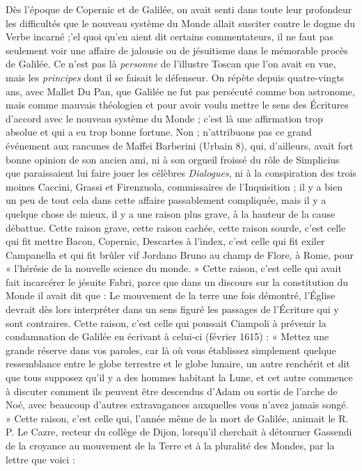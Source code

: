 \documentclass[a4paper, 11pt, oneside]{article}
\begin{document}
Dès l'époque de Copernic et de Galilée, on avait senti dans toute leur profondeur les difficultés que le nouveau système du Monde allait susciter contre le dogme du Verbe incarné ;'el quoi qu'en aient dit certains commentateurs, il ne faut pas seulement voir une affaire de jalousie ou de jésuitisme dans le mémorable procès de Galilée. Ce n'est pas là \emph{personne} de l'illustre Toscan que l'on avait en vue, mais les \emph{principes} dont il se faisait le défenseur. On répète depuis quatre-vingts ans, avec Mallet Du Pan, que Galilée ne fut pas persécuté comme bon astronome, mais comme mauvais théologien et pour avoir voulu mettre le sens des Écritures d'accord avec le nouveau système du Monde ; c'est là une affirmation trop absolue et qui a eu trop bonne fortune. Non ; n'attribuons pas ce grand événement aux rancunes de Maffei Barberini (Urbain 8), qui, d'ailleurs, avait fort bonne opinion de son ancien ami, ni à son orgueil froissé du rôle de Simplicius que paraissaient lui faire jouer les célèbres \emph{Dialogues}, ni à la conspiration des trois moines Caccini, Grassi et Firenzuola, commissaires de l'Inquisition ; il y a bien un peu de tout cela dans cette affaire passablement compliquée, mais il y a quelque chose de mieux, il y a une raison plus grave, à la hauteur de la cause débattue. Cette raison grave, cette raison cachée, cette raison sourde, c'est celle qui fit mettre Bacon, Copernic, Descartes à l'index, c'est celle qui fit exiler Campanella et qui fit brûler vif Jordano Bruno au champ de Flore, à Rome, pour « l'hérésie de la nouvelle science du monde. » Cette raison, c'est celle qui avait fait incarcérer le jésuite Fabri, parce que dans un discours sur la constitution du Monde il avait dit que : Le mouvement de la terre une fois démontré, l'Église devrait dès lors interpréter dans un sens figuré les passages de l'Écriture qui y sont contraires. Cette raison, c'est celle qui poussait Ciampoli à prévenir la condamnation de Galilée en écrivant à celui-ci (février 1615) : « Mettez une grande réserve dans vos paroles, car là où vous établissez simplement quelque ressemblance entre le globe terrestre et le globe lunaire, un autre renchérit et dit que tous supposez qu'il y a des hommes habitant la Lune, et cet autre commence à discuter comment ils peuvent être descendus d'Adam ou sortis de l'arche de Noé, avec beaucoup d'autres extravagances auxquelles vous n'avez jamais songé. » Cette raison, c'est celle qui, l'année même de la mort de Galilée, animait le R. P. Le Cazre, recteur du collège de Dijon, lorsqu'il cherchait à détourner Gassendi de la croyance au mouvement de la Terre et à la pluralité des Mondes, par la lettre que voici :
\end{document}
